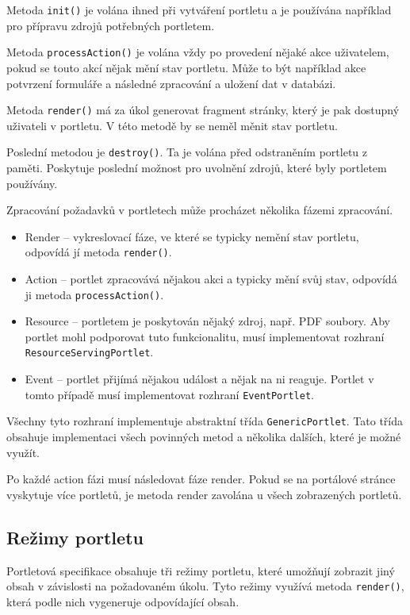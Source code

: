 \documentclass{fithesis}
\begin{document}
Metoda \verb|init()| je volána ihned při vytváření portletu a je používána například pro přípravu zdrojů potřebných portletem.

Metoda \verb|processAction()| je volána vždy po provedení nějaké akce uživatelem, pokud se touto akcí nějak mění stav portletu. Může to být například akce potvrzení formuláře a následné zpracování a uložení dat v databázi.

Metoda \verb|render()| má za úkol generovat fragment stránky, který je pak dostupný uživateli v portletu. V této metodě by se neměl měnit stav portletu.

Poslední metodou je \verb|destroy()|. Ta je volána před odstraněním portletu z paměti. Poskytuje poslední možnost pro uvolnění zdrojů, které byly portletem používány. \cite{jsr-286}
\clearpage

Zpracování požadavků v portletech může procházet několika fázemi zpracování.

\begin{itemize}
\item Render -- vykreslovací fáze, ve které se typicky nemění stav portletu, odpovídá jí metoda \verb|render()|.
\item Action -- portlet zpracovává nějakou akci a typicky mění svůj stav, odpovídá ji metoda \verb|processAction()|.
\item Resource -- portletem je poskytován nějaký zdroj, např. PDF soubory. Aby portlet mohl podporovat tuto funkcionalitu, musí implementovat rozhraní \verb|ResourceServingPortlet|.
\item Event -- portlet přijímá nějakou událost a nějak na ni reaguje. Portlet v tomto případě musí implementovat rozhraní \verb|EventPortlet|.
\end{itemize}

Všechny tyto rozhraní implementuje abstraktní třída \verb|GenericPortlet|. Tato třída obsahuje implementaci všech povinných metod a několika dalších, které je možné využít.

Po každé action fázi musí následovat fáze render. Pokud se na portálové stránce vyskytuje více portletů, je metoda render zavolána u všech zobrazených portletů. 

\subsection*{Režimy portletu}
Portletová specifikace obsahuje tři režimy portletu, které umožňují zobrazit jiný obsah v závislosti na požadovaném úkolu. Tyto režimy využívá metoda \verb|render()|, která podle nich vygeneruje odpovídající obsah.
\end{document}
